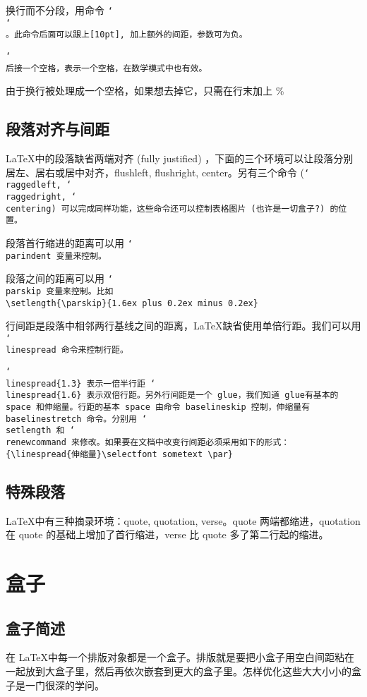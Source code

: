 \documentclass[a4paper]{article}
\newcommand\tbs[1][]{\tt\char`\\#1}
\begin{document}
    换行而不分段，用命令 \tbs\tbs。此命令后面可以跟上[10pt], 加上额外的间距，参数可为负。

    \tbs 后接一个空格，表示一个空格，在数学模式中也有效。

    由于换行被处理成一个空格，如果想去掉它，只需在行末加上 \%
  \subsection{段落对齐与间距}
    \LaTeX 中的段落缺省两端对齐 (fully justified) ，下面的三个环境可以让段落分别居左、居右或居中对齐，flushleft, flushright, center。另有三个命令 (\tbs{raggedleft}, \tbs{raggedright}, \tbs{centering}) 可以完成同样功能，这些命令还可以控制表格图片 (也许是一切盒子?) 的位置。

    段落首行缩进的距离可以用 \tbs{parindent} 变量来控制。

    段落之间的距离可以用 \tbs{parskip} 变量来控制。比如\\
    \verb|\setlength{\parskip}{1.6ex plus 0.2ex minus 0.2ex}|

    行间距是段落中相邻两行基线之间的距离，\LaTeX 缺省使用单倍行距。我们可以用 \tbs{linespread} 命令来控制行距。

    \tbs{linespread}\{1.3\} 表示一倍半行距 \quad \tbs{linespread}\{1.6\} 表示双倍行距。另外行间距是一个 glue，我们知道 glue有基本的 space 和伸缩量。行距的基本 space 由命令 baselineskip 控制，伸缩量有 baselinestretch 命令。分别用 \tbs{setlength} 和 \tbs{renewcommand} 来修改。如果要在文档中改变行间距必须采用如下的形式：\\
    \verb|{\linespread{伸缩量}\selectfont sometext \par}|
  \subsection{特殊段落}
    \LaTeX 中有三种摘录环境：quote, quotation, verse。quote 两端都缩进，quotation 在 quote 的基础上增加了首行缩进，verse 比 quote 多了第二行起的缩进。
\section{盒子}
  \subsection{盒子简述}
  在 \LaTeX 中每一个排版对象都是一个盒子。排版就是要把小盒子用空白间距粘在一起放到大盒子里，然后再依次嵌套到更大的盒子里。怎样优化这些大大小小的盒子是一门很深的学问。
\end{document}
